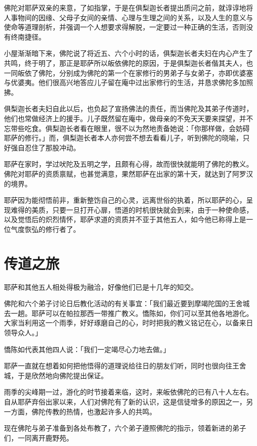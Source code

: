 \documentclass[twoside,openany]{book}
\begin{document}
佛陀对耶萨双亲的来意，了如指掌，于是在俱梨迦长者提出质问之前，就谆谆地将人事物间的因缘、父母子女间的亲情、心理与生理之间的关系，以及人生的意义与使命等道理剖析，并强调一个人想要求得解脱，一定要过一种正确的生活，否则没有终南捷径。

小屋渐渐暗下来，佛陀说了将近五、六个小时的话，俱梨迦长者夫妇在内心产生了共鸣，终于明了，那正是耶萨所以皈依佛陀的原因，于是俱梨迦长者偕其夫人，也一同皈依了佛陀，分别成为佛陀的第一个在家修行的男弟子与女弟子，亦即优婆塞与优婆夷。他们很高兴地答应儿子留在庵中过出家修行的生活，并恳求佛陀多加照拂。

俱梨迦长者夫妇自此以后，也负起了宣扬佛法的责任，而当佛陀及其弟子传道时，他们也常做经济上的援手。儿子既然留在庵中，做母亲的不免天天要来探望，并不忘带些吃食。俱梨迦长者看在眼里，很不以为然地责备她说：「你那样做，会妨碍耶萨的修行。」而，俱梨迦长者本人亦何尝不想去看看儿子，听到佛陀的晓喻，只好强自忍住了那股冲动。

耶萨在家时，学过吠陀及五明之学，且颇有心得，故而很快就能明了佛陀的教义。佛陀对耶萨的资质禀赋，也甚觉满意，果然耶萨在出家的第十天，就达到了阿罗汉的境界。

耶萨因为能彻悟前非，重新整饬自己的心灵，远离世俗的执着，所以耶萨的心，呈现难得的美质，只要一旦打开心扉，悟道的时机很快就会到来，由于一种使命感，以及觉悟后的炽烈情怀，耶萨求道的资质并不亚于其他五人，如今他已称得上是一位气度恢弘的修行者了。

\section{传道之旅}\label{sec3.2}

耶萨和其他五人相处得极为融洽，好像他们已是十几年的知交。

佛陀和六个弟子讨论日后教化活动的有关事宜：「我们最近要到摩竭陀国的王舍城去一趟。耶萨可以在帕拉那西一带推广教义。憍陈如，你们可以至其他各地游化。大家当利用这一个雨季，好好琢磨自己的心，时时把我的教义铭记在心，以备来日领导众人。」

憍陈如代表其他四人说：「我们一定竭尽心力地去做。」

耶萨一直就在想着如何把他悟得的道理说给往日的朋友们听，同时也很向往王舍城，于是欣然地向佛陀提出保证。

雨季的尖峰期一过，游化的时节接着来临，这时，来皈依佛陀的已有八十人左右。自从耶萨弃俗出家以来，人们对佛陀有了新的认识，这是信徒增多的原因之一，另一方面，佛陀传教的热情，也激起许多人的共鸣。

现在佛陀与弟子准备到各处布教了，六个弟子遵照佛陀的指示，领着新进的弟子们，一同离开鹿野苑。
\end{document}
